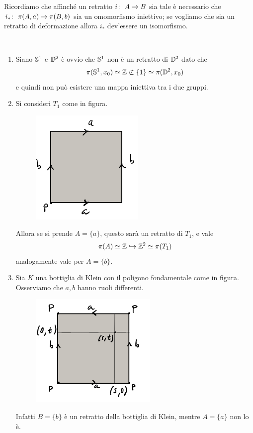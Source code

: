 
\begin{remark}
	Ricordiamo che affinché un retratto $\morphism{i}{A}{B}$ sia tale è necessario che $\morphism{i_*}{\pi(A, a)}{\pi(B, b)}$ sia un omomorfismo iniettivo; se vogliamo che sia un retratto di deformazione allora $i_*$ dev'essere un isomorfismo. 
\end{remark}

\begin{example}\
	\begin{enumerate}
		\item Siano $\S^1$ e $\D^2$ è ovvio che $\S^1$ non è un retratto di $\D^2$ dato che
		\begin{equation*}
		\pi(\S^1, x_0) \simeq \Z \not\subset \{1\} \simeq \pi(\D^2, x_0)
		\end{equation*}
		e quindi non può esistere una mappa iniettiva tra i due gruppi. 
		\item Si consideri $T_1$ come in figura.
		\begin{figure}[H]
			\centering
			\includegraphics[width=0.3\linewidth]{images/topologia_algebrica/torus_polygon}
			\caption{}
			\label{fig:toruspolygon}
		\end{figure}
		Allora se si prende $A = \{a\}$, questo sarà un retratto di $T_1$, e vale
		\begin{equation*}
			\pi(A) \simeq \Z \hookrightarrow \Z^2 \simeq \pi(T_1)
		\end{equation*}
		analogamente vale per $A = \{b\}$.
		\item Sia $K$ una bottiglia di Klein con il poligono fondamentale come in figura. Osserviamo che $a, b$ hanno ruoli differenti. 
		\begin{figure}[H]
			\centering
			\includegraphics[width=0.3\linewidth]{images/topologia_algebrica/klein_polygon}
			\caption{}
			\label{fig:kelinpolygon}
		\end{figure}
		Infatti $B = \{b\}$ è un retratto della bottiglia di Klein, mentre $A = \{a\}$ non lo è. \
		

\end{enumerate}
\end{example}
